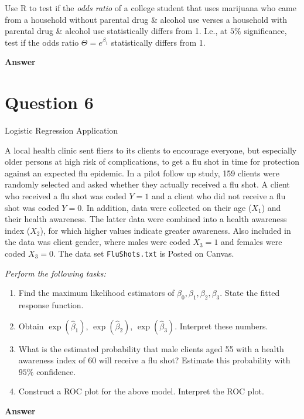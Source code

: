 \documentclass[letterpaper]{article}
\begin{document}
	Use R to test if the \textit{odds ratio} of a college student that uses marijuana who came from a household without parental drug \& alcohol use verses a household with parental drug \& alcohol use statistically differs from 1. I.e., at $5\%$ significance, test if the odds ratio $\Theta = e^{\beta_1}$ statistically differs from 1.

	
	\textbf{Answer}
	
	\clearpage
	
	\section{Question 6}
	
	{\color{deepred} Logistic Regression Application}
	
	A local health clinic sent fliers to its clients to encourage everyone, but especially older persons at high risk of complications, to get a flu shot in time for protection against an expected flu epidemic. In a pilot follow up study, 159 clients were randomly selected and asked whether they actually received a flu shot. A client who received a flu shot was coded $Y = 1$ and a client who did not receive a flu shot was coded $Y = 0$. In addition, data were collected on their age ($X_1$) and their health awareness. The latter data were combined into a health awareness index ($X_2$), for which higher values indicate greater awareness. Also included in the data was client gender, where males were coded $X_3 = 1$ and females were coded $X_3 = 0$. The data set \texttt{FluShots.txt} is Posted on Canvas.
	
	\textit{Perform the following tasks:}
	
	\begin{enumerate}
		\item Find the maximum likelihood estimators of $\beta_0, \beta_1, \beta_2, \beta_3$. State the fitted response function.
		\item Obtain $\exp(\hat{\beta}_1)$, $\exp(\hat{\beta}_2)$, $\exp(\hat{\beta}_3)$. Interpret these numbers.
		\item What is the estimated probability that male clients aged 55 with a health awareness index of 60 will receive a flu shot? Estimate this probability with $95\%$ confidence.
		\item Construct a ROC plot for the above model. Interpret the ROC plot.
	\end{enumerate}

	\textbf{Answer}
	
\end{document}
